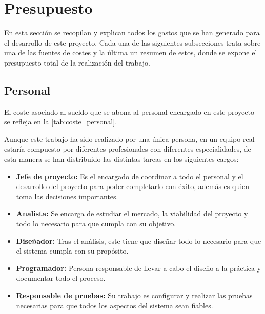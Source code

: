 \section{Presupuesto}\label{sec:presupuesto}
En esta sección se recopilan y explican todos los gastos que se han generado para el desarrollo de este proyecto. Cada una de las siguientes subsecciones trata sobre una de las fuentes de costes y la última un resumen de estos, donde se expone el presupuesto total de la realización del trabajo.

\subsection{Personal}\label{subsec:personal}
El coste asociado al sueldo que se abona al personal encargado en este proyecto se refleja en la \autoref{tab:coste_personal}.

Aunque este trabajo ha sido realizado por una única persona, en un equipo real estaría compuesto por diferentes profesionales con diferentes especialidades, de esta manera se han distribuido las distintas tareas en los siguientes cargos:
\begin{itemize}
	\item \textbf{Jefe de proyecto:} Es el encargado de coordinar a todo el personal y el desarrollo del proyecto para poder completarlo con éxito, además es quien toma las decisiones importantes.
	\item \textbf{Analista:} Se encarga de estudiar el mercado, la viabilidad del proyecto y todo lo necesario para que cumpla con su objetivo.
	\item \textbf{Diseñador:} Tras el análisis, este tiene que diseñar todo lo necesario para que el sistema cumpla con su propósito.
	\item \textbf{Programador:} Persona responsable de llevar a cabo el diseño a la práctica y documentar todo el proceso.
	\item \textbf{Responsable de pruebas:} Su trabajo es configurar y realizar las pruebas necesarias para que todos los aspectos del sistema sean fiables.
\end{itemize}

